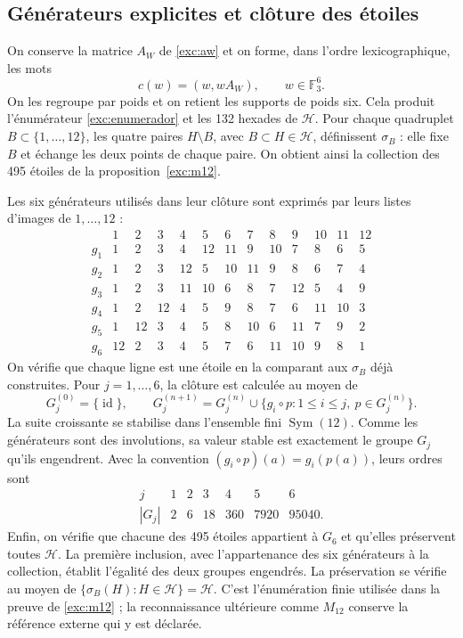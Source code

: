 \subsection{Générateurs explicites et clôture des étoiles}
\label{iv:apendice-estrellas}

On conserve la matrice \(A_W\) de \eqref{exc:aw} et on forme,
dans l’ordre lexicographique, les mots
\[
 c(w)=(w,wA_W),\qquad w\in\mathbb F_3^6.
\]
On les regroupe par poids et on retient les supports de poids six.
Cela produit l’énumérateur \eqref{exc:enumerador} et les 132 hexades
de \(\mathcal H\). Pour chaque quadruplet \(B\subset\{1,\ldots,12\}\),
les quatre paires \(H\setminus B\), avec \(B\subset H\in\mathcal H\),
définissent \(\sigma_B\) : elle fixe \(B\) et échange les deux points
de chaque paire. On obtient ainsi la collection des 495 étoiles de
la proposition~\ref{exc:m12}.

Les six générateurs utilisés dans leur clôture sont exprimés par leurs listes
d’images de \(1,\ldots,12\) :
\[
\begin{array}{c|rrrrrrrrrrrr}
 &1&2&3&4&5&6&7&8&9&10&11&12\\ \hline
g_1&1&2&3&4&12&11&9&10&7&8&6&5\\
g_2&1&2&3&12&5&10&11&9&8&6&7&4\\
g_3&1&2&3&11&10&6&8&7&12&5&4&9\\
g_4&1&2&12&4&5&9&8&7&6&11&10&3\\
g_5&1&12&3&4&5&8&10&6&11&7&9&2\\
g_6&12&2&3&4&5&7&6&11&10&9&8&1
\end{array}
\]
On vérifie que chaque ligne est une étoile en la comparant aux
\(\sigma_B\) déjà construites. Pour \(j=1,\ldots,6\), la clôture
est calculée au moyen de
\[
 G_j^{(0)}=\{\operatorname{id}\},\qquad
 G_j^{(n+1)}
 =G_j^{(n)}\cup
   \{g_i\circ p:1\leq i\leq j,\ p\in G_j^{(n)}\}.
\]
La suite croissante se stabilise dans l’ensemble fini
\(\operatorname{Sym}(12)\). Comme les générateurs sont des involutions,
sa valeur stable est exactement le groupe \(G_j\) qu’ils engendrent.
Avec la convention \((g_i\circ p)(a)=g_i(p(a))\), leurs ordres sont
\[
\begin{array}{c|rrrrrr}
 j&1&2&3&4&5&6\\ \hline
 |G_j|&2&6&18&360&7920&95040 .
\end{array}
\]
Enfin, on vérifie que chacune des 495 étoiles appartient
à \(G_6\) et qu’elles préservent toutes \(\mathcal H\). La première inclusion,
avec l’appartenance des six générateurs à la collection,
établit l’égalité des deux groupes engendrés. La préservation se vérifie
au moyen de \(\{\sigma_B(H):H\in\mathcal H\}=\mathcal H\).
C’est l’énumération finie utilisée dans la preuve de
\ref{exc:m12} ; la reconnaissance ultérieure comme \(M_{12}\)
conserve la référence externe qui y est déclarée.
